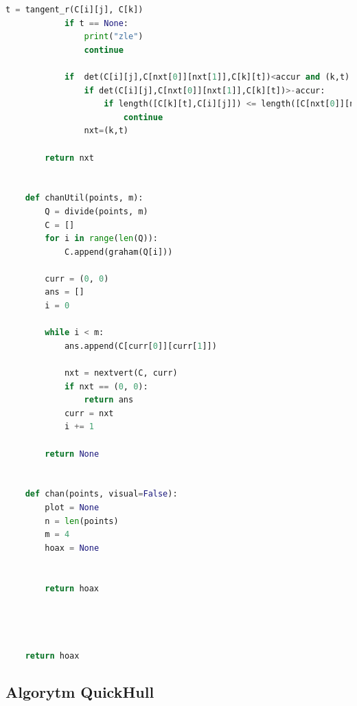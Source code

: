 \documentclass[11pt]{article}
\theoremstyle{remark} \newtheorem{definition}{def.}
\theoremstyle{definition} \newtheorem{twierdzenie}{tw.}
\begin{document}
\begin{lstlisting}[language=Python]
            t = tangent_r(C[i][j], C[k])
            if t == None:
                print("zle")
                continue
    
            if  det(C[i][j],C[nxt[0]][nxt[1]],C[k][t])<accur and (k,t)!=(curr):
                if det(C[i][j],C[nxt[0]][nxt[1]],C[k][t])>-accur:
                    if length([C[k][t],C[i][j]]) <= length([C[nxt[0]][nxt[1]],C[i][j]]):
                        continue
                nxt=(k,t)
    
        return nxt
    
    
    def chanUtil(points, m):
        Q = divide(points, m)
        C = []
        for i in range(len(Q)):
            C.append(graham(Q[i]))
    
        curr = (0, 0)
        ans = []
        i = 0
    
        while i < m:
            ans.append(C[curr[0]][curr[1]])
    
            nxt = nextvert(C, curr)
            if nxt == (0, 0):
                return ans
            curr = nxt
            i += 1
    
        return None
    
    
    def chan(points, visual=False):
        plot = None
        n = len(points)
        m = 4
        hoax = None
    
    
        return hoax
    
    
    

    return hoax
\end{lstlisting}
    

\subsection{Algorytm QuickHull}
\end{document}
